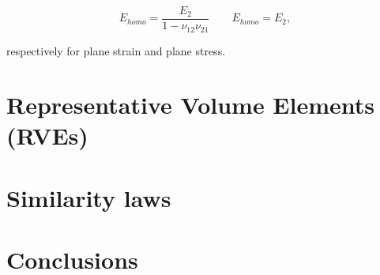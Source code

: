 \documentclass[a4paper,fleqn]{cas-dc}
\begin{document}
\begin{equation}\label{eq:elasticresponse}
E_{homo}=\frac{E_{2}}{1-\nu_{12}\nu_{21}}\qquad E_{homo}=E_{2},
\end{equation}

respectively for plane strain and plane stress.
\section{Representative Volume Elements (RVEs)}






\section{Similarity laws}



\section{Conclusions}




%





%
%
\end{document}
